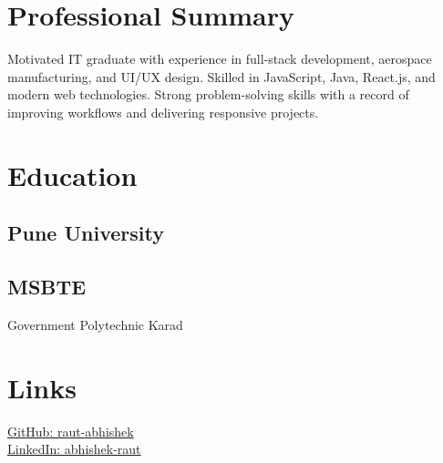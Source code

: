 \documentclass[11pt]{deedy-resume-openfont}
\begin{document}

\begin{minipage}[t]{0.33\textwidth} 

\section*{Professional Summary}
Motivated IT graduate with experience in full-stack development, aerospace manufacturing, and UI/UX design. Skilled in JavaScript, Java, React.js, and modern web technologies. Strong problem-solving skills with a record of improving workflows and delivering responsive projects.
\sectionsep

\section{Education} 

\subsection{Pune University}
\sectionsep

\subsection{MSBTE}
Government Polytechnic Karad \\
\sectionsep

\section{Links}
\href{https://github.com/raut-abhishek}{GitHub: raut-abhishek} \\
\href{https://linkedin.com/in/abhishek-raut-736a3a21a}{LinkedIn: abhishek-raut}


\end{minipage}
\end{document}
